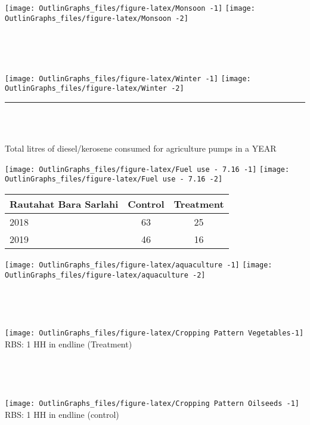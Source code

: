 \documentclass[
]{article}
\begin{document}
\texttt{[image: OutlinGraphs\_files/figure-latex/Monsoon -1]}
\texttt{[image: OutlinGraphs\_files/figure-latex/Monsoon -2]}

~

~

\noindent
{}

\texttt{[image: OutlinGraphs\_files/figure-latex/Winter -1]}
\texttt{[image: OutlinGraphs\_files/figure-latex/Winter -2]}

\begin{center}\rule{0.5\linewidth}{0.5pt}\end{center}

~

\noindent {}\\
Total litres of diesel/kerosene consumed for agriculture pumps in a YEAR

\texttt{[image: OutlinGraphs\_files/figure-latex/Fuel use - 7.16 -1]}
\texttt{[image: OutlinGraphs\_files/figure-latex/Fuel use - 7.16 -2]}

\begin{longtable}[]{@{}lcc@{}}
\toprule
Rautahat Bara Sarlahi & Control & Treatment\tabularnewline
\midrule
\endhead
2018 & 63 & 25\tabularnewline
2019 & 46 & 16\tabularnewline
\bottomrule
\end{longtable}

\newpage

\noindent {}

\texttt{[image: OutlinGraphs\_files/figure-latex/aquaculture -1]}
\texttt{[image: OutlinGraphs\_files/figure-latex/aquaculture -2]}

~

~

\noindent
{}

\texttt{[image: OutlinGraphs\_files/figure-latex/Cropping Pattern Vegetables-1]}
RBS: 1 HH in endline (Treatment)

~

~

\noindent
{}

\texttt{[image: OutlinGraphs\_files/figure-latex/Cropping Pattern Oilseeds -1]}
RBS: 1 HH in endline (control)
\end{document}
